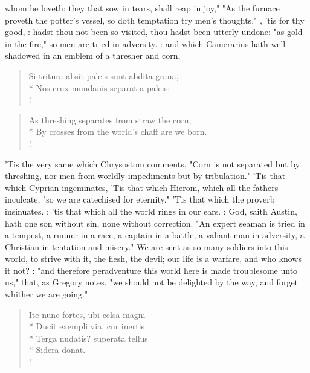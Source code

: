 {whom he loveth: they that sow in tears, shall reap in joy,"  "As the furnace proveth the potter's vessel, so doth temptation try men's thoughts," , 'tis for thy good, : hadst thou not been so visited, thou hadst been utterly undone: "as gold in the fire," so men are tried in adversity. : and which Camerarius hath well shadowed in an emblem of a thresher and corn,
%
\begin{latin}
\begin{verse}%
Si tritura absit paleis sunt abdita grana,\\*
Nos crux mundanis separat a paleis:\\!
\end{verse}%
\end{latin}
\translationrule%
\begin{verse}%
As threshing separates from straw the corn,\\*
By crosses from the world's chaff are we born.\\!
\end{verse}%

'Tis the very same which Chrysostom comments,  "Corn is not separated but by threshing, nor men from worldly impediments but by tribulation." 'Tis that which Cyprian ingeminates,  'Tis that which Hierom, which all the fathers inculcate, "so we are catechised for eternity." 'Tis that which the proverb insinuates. ; 'tis that which all the world rings in our ears. : God, saith Austin, hath one son without sin, none without correction. "An expert seaman is tried in a tempest, a runner in a race, a captain in a battle, a valiant man in adversity, a Christian in tentation and misery."  We are sent as so many soldiers into this world, to strive with it, the flesh, the devil; our life is a warfare, and who knows it not? : "and therefore peradventure this world here is made troublesome unto us," that, as Gregory notes, "we should not be delighted by the way, and forget whither we are going."

\begin{latin}%
\begin{verse}%
Ite nunc fortes, ubi celsa magni\\*
Ducit exempli via, cur inertis\\*
Terga nudatis? superata tellus\\*
Sidera donat.\\!
\end{verse}%
\end{latin}%
%

}
